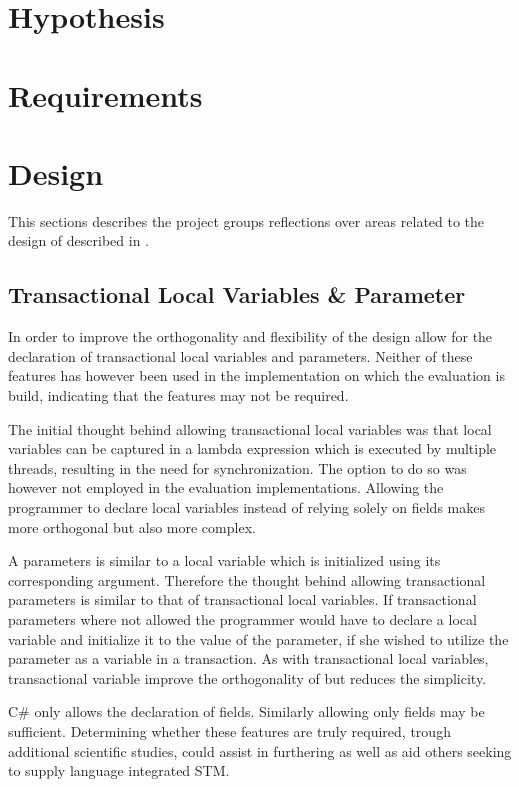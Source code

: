 \section{Hypothesis}
\section{Requirements}
\section{Design}
This sections describes the project groups reflections over areas related to the design of \stmname described in . 

\subsection{Transactional Local Variables \& Parameter}
In order to improve the orthogonality and flexibility of \stmname the design allow for the declaration of transactional local variables and parameters. Neither of these features has however been used in the implementation on which the evaluation is build, indicating that the features may not be required. 

The initial thought behind allowing transactional local variables was that local variables can be captured in a lambda expression which is executed by multiple threads, resulting in the need for synchronization. The option to do so was however not employed in the evaluation implementations. Allowing the programmer to declare  local variables instead of relying solely on  fields makes \stmnamesp more orthogonal but also more complex.

A parameters is similar to a local variable which is initialized using its corresponding argument\cite[p. 76]{sestoft2011c}. Therefore the thought behind allowing transactional parameters is similar to that of transactional local variables. If transactional parameters where not allowed the programmer would have to declare a  local variable and initialize it to the value of the parameter, if she wished to utilize the parameter as a variable in a transaction. As with transactional local variables, transactional variable improve the orthogonality of \stmname but reduces the simplicity.

C\# only allows the declaration of  fields. Similarly allowing only  fields may be sufficient. Determining whether these features are truly required, trough additional scientific studies, could assist in furthering \stmanme as well as aid others seeking to supply language integrated \ac{STM}. 


